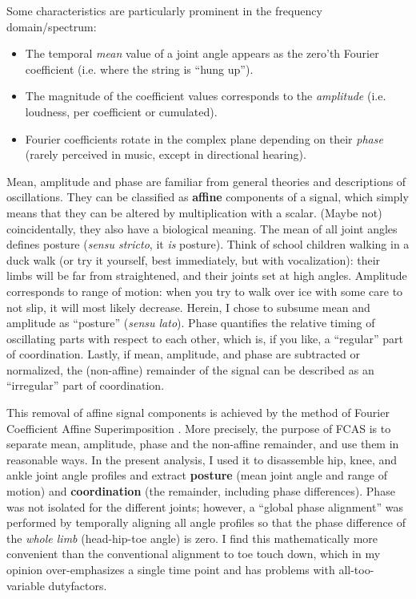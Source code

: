 Some characteristics are particularly prominent in the frequency domain/spectrum:
\begin{itemize}
\item The temporal \emph{mean} value of a joint angle appears as the zero'th Fourier coefficient (i.e. where the string is ``hung up'').
\item The magnitude of the coefficient values corresponds to the \emph{amplitude} (i.e. loudness, per coefficient or cumulated).
\item Fourier coefficients rotate in the complex plane depending on their \emph{phase} (rarely perceived in music, except in directional hearing).
\end{itemize}


Mean, amplitude and phase are familiar from general theories and descriptions of oscillations.
They can be classified as \textbf{affine} components of a signal, which simply means that they can be altered by multiplication with a scalar.
(Maybe not) coincidentally, they also have a biological meaning.
The mean of all joint angles defines posture (\emph{sensu stricto}, it \emph{is} posture).
Think of school children walking in a duck walk (or try it yourself, best immediately, but with vocalization): their limbs will be far from straightened, and their joints set at high angles.
Amplitude corresponds to range of motion: when you try to walk over ice with some care to not slip, it will most likely decrease.
Herein, I chose to subsume mean and amplitude as ``posture'' (\emph{sensu lato}).
Phase quantifies the relative timing of oscillating parts with respect to each other, which is, if you like, a ``regular'' part of coordination.
Lastly, if mean, amplitude, and phase are subtracted or normalized, the (non-affine) remainder of the signal can be described as an ``irregular'' part of coordination.

This removal of affine signal components is achieved by the method of Fourier Coefficient Affine Superimposition \citep[FCAS,][]{Mielke2019}.
More precisely, the purpose of FCAS is to separate mean, amplitude, phase and the non-affine remainder, and use them in reasonable ways.
In the present analysis, I used it to disassemble hip, knee, and ankle joint angle profiles and extract \textbf{posture} (mean joint angle and range of motion) and \textbf{coordination} (the remainder, including phase differences).
Phase was not isolated for the different joints; however, a ``global phase alignment'' was performed by temporally aligning all angle profiles so that the phase difference of the \emph{whole limb} (head-hip-toe angle) is zero.
I find this mathematically more convenient than the conventional alignment to toe touch down, which in my opinion over-emphasizes a single time point and has problems with all-too-variable dutyfactors.

